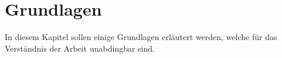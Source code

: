 \chapter{Grundlagen}
\label{sec:grundlagen}
In diesem Kapitel sollen einige Grundlagen erläutert werden, welche für das Verständnis der Arbeit unabdingbar sind. 





